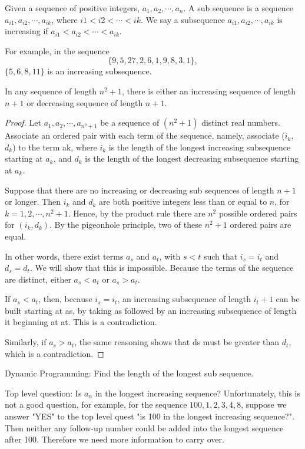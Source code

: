 Given a sequence of positive integers, $a_1, a_2, \cdots, a_n$. A sub sequence is a sequence $ a_{i1}, a_{i2}, \cdots, a_{ik}$, where $i1 < i2 < \cdots < ik$. We say a subsequence $a_{i1}, a_{i2}, \cdots, a_{ik}$ is increasing if $a_{i1} < a_{i2} < \cdots < a_{ik}$.

For example, in the sequence
\[\{9, 5, 27, 2, 6, 1, 9, 8, 3, 1\},\]
$\{5, 6, 8, 11\}$ is an increasing subsequence.

\begin{lemma}
	In any sequence of length $n^2 + 1$, there is either an increasing sequence of length $n+1$ or decreasing sequence of length $n+1$.
\end{lemma}

\begin{proof}
	Let $a_1, a_2, \cdots, a_{n^2 + 1}$ be a sequence of $(n^2 + 1)$ distinct real numbers. Associate an ordered pair with each term of the sequence, namely, associate ($i_k$, $d_k$) to the term ak, where $i_k$ is the length of the longest increasing subsequence starting at $a_k$, and $d_k$ is the length of the longest decreasing subsequence starting at $a_k$.
	
	Suppose that there are no increasing or decreasing sub sequences of length $n+1$ or longer. Then $i_k$ and $d_k$ are both positive integers less than or equal to $n$, for $k = 1, 2, \cdots, n^2 + 1$. Hence, by the product rule there are $n^2$ possible ordered pairs for $(i_k, d_k)$. By the pigeonhole principle, two of these $n^2 + 1$ ordered pairs are equal.

	In other words, there exist terms $a_s$ and $a_t$, with $s < t$ such that $i_s = i_t$ and $d_s = d_t$. We will show that this is impossible. Because the terms of the sequence are distinct, either $a_s < a_t$ or $a_s > a_t$. 
	
	If $a_s < a_t$, then, because $i_s = i_t$, an increasing subsequence of length $i_t + 1$ can be built starting at as, by taking as followed
	by an increasing subsequence of length it beginning at at. This is a contradiction. 
	
	Similarly, if $a_s > a_t$, the same reasoning shows that ds must be greater than $d_t$, which is a contradiction.
\end{proof}

Dynamic Programming: Find the length of the longest sub sequence.

Top level question: Is $a_n$ in the longest increasing sequence? Unfortunately, this is not a good question, for example, for the sequence $100, 1, 2, 3, 4, 8$, suppose we answer "YES" to the top level quest "is 100 in the longest increasing sequence?". Then neither any follow-up number could be added into the longest sequence after 100. Therefore we need more information to carry over.

